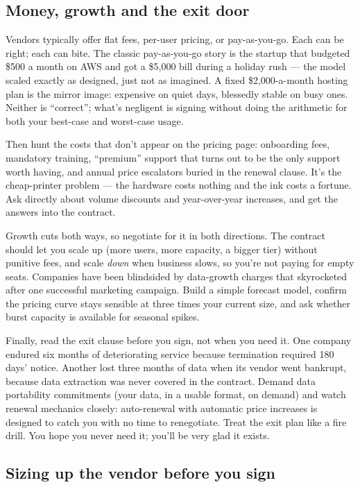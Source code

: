 \subsection{Money, growth and the exit door}


Vendors typically offer flat fees, per-user pricing, or pay-as-you-go. Each can be right; each can bite. The classic pay-as-you-go story is the startup that budgeted \$500 a month on AWS and got a \$5,000 bill during a holiday rush — the model scaled exactly as designed, just not as imagined. A fixed \$2,000-a-month hosting plan is the mirror image: expensive on quiet days, blessedly stable on busy ones. Neither is ``correct''; what's negligent is signing without doing the arithmetic for both your best-case and worst-case usage.


Then hunt the costs that don't appear on the pricing page: onboarding fees, mandatory training, ``premium'' support that turns out to be the only support worth having, and annual price escalators buried in the renewal clause. It's the cheap-printer problem — the hardware costs nothing and the ink costs a fortune. Ask directly about volume discounts and year-over-year increases, and get the answers into the contract.


Growth cuts both ways, so negotiate for it in both directions. The contract should let you scale up (more users, more capacity, a bigger tier) without punitive fees, and scale \emph{down} when business slows, so you're not paying for empty seats. Companies have been blindsided by data-growth charges that skyrocketed after one successful marketing campaign. Build a simple forecast model, confirm the pricing curve stays sensible at three times your current size, and ask whether burst capacity is available for seasonal spikes.


Finally, read the exit clause before you sign, not when you need it. One company endured six months of deteriorating service because termination required 180 days' notice. Another lost three months of data when its vendor went bankrupt, because data extraction was never covered in the contract. Demand data portability commitments (your data, in a usable format, on demand) and watch renewal mechanics closely: auto-renewal with automatic price increases is designed to catch you with no time to renegotiate. Treat the exit plan like a fire drill. You hope you never need it; you'll be very glad it exists.



\subsection{Sizing up the vendor before you sign}


